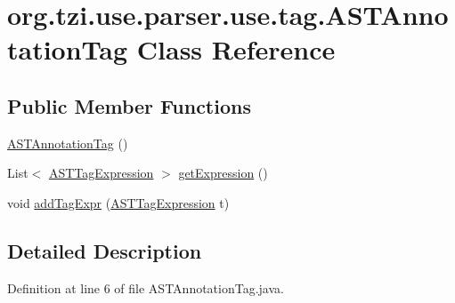 \hypertarget{classorg_1_1tzi_1_1use_1_1parser_1_1use_1_1tag_1_1_a_s_t_annotation_tag}{\section{org.\-tzi.\-use.\-parser.\-use.\-tag.\-A\-S\-T\-Annotation\-Tag Class Reference}
\label{classorg_1_1tzi_1_1use_1_1parser_1_1use_1_1tag_1_1_a_s_t_annotation_tag}
}
\subsection*{Public Member Functions}
\begin{DoxyCompactItemize}
\item 
\hyperlink{classorg_1_1tzi_1_1use_1_1parser_1_1use_1_1tag_1_1_a_s_t_annotation_tag_aefa4db873f4a154485386b2917b0db53}{A\-S\-T\-Annotation\-Tag} ()
\item 
List$<$ \hyperlink{classorg_1_1tzi_1_1use_1_1parser_1_1use_1_1tag_1_1_a_s_t_tag_expression}{A\-S\-T\-Tag\-Expression} $>$ \hyperlink{classorg_1_1tzi_1_1use_1_1parser_1_1use_1_1tag_1_1_a_s_t_annotation_tag_adf7988cbd8a5a13a84ddc88702bfa298}{get\-Expression} ()
\item 
void \hyperlink{classorg_1_1tzi_1_1use_1_1parser_1_1use_1_1tag_1_1_a_s_t_annotation_tag_a7f5191b56298801376ec9d7cc2a3531f}{add\-Tag\-Expr} (\hyperlink{classorg_1_1tzi_1_1use_1_1parser_1_1use_1_1tag_1_1_a_s_t_tag_expression}{A\-S\-T\-Tag\-Expression} t)
\end{DoxyCompactItemize}


\subsection{Detailed Description}


Definition at line 6 of file A\-S\-T\-Annotation\-Tag.\-java.



